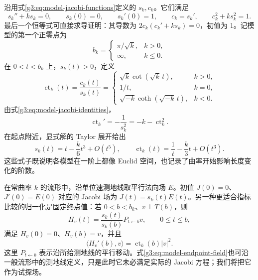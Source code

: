 沿用式\eqref{g3:eq:model-jacobi-functions}定义的 \(s_k,c_k\)。它们满足
\begin{equation}\label{g3:eq:model-jacobi-identities}
	s_k''+ks_k=0,\qquad s_k(0)=0,\qquad s_k'(0)=1,
	\qquad c_k=s_k',\qquad c_k^2+ks_k^2=1.
\end{equation}
最后一个恒等式可直接求导证明：其导数为 \(2c_k(c_k'+ks_k)=0\)，初值为 \(1\)。记模型的第一个正零点为
\begin{equation}\label{g3:eq:model-first-zero}
	b_k=
	\begin{cases}
		\pi/\sqrt{k},&k>0,\\
		\infty,&k\le0.
	\end{cases}
\end{equation}
在 \(0<t<b_k\) 上，\(s_k(t)>0\)，定义
\begin{equation}\label{g3:eq:model-cotangent}
	\operatorname{ct}_k(t)=\frac{c_k(t)}{s_k(t)}
	=
	\begin{cases}
		\sqrt{k}\cot(\sqrt{k}\,t),&k>0,\\
		1/t,&k=0,\\
		\sqrt{-k}\coth(\sqrt{-k}\,t),&k<0.
	\end{cases}
\end{equation}
由式\eqref{g3:eq:model-jacobi-identities}，
\begin{equation}\label{g3:eq:model-cotangent-derivative}
	\operatorname{ct}_k'=-\frac1{s_k^2}
	=-k-\operatorname{ct}_k^2.
\end{equation}
在起点附近，显式解的 Taylor 展开给出
\begin{equation}\label{g3:eq:model-small-radius-expansion}
	s_k(t)=t-\frac{k}{6}t^3+O(t^5),
	\qquad \operatorname{ct}_k(t)=\frac1t-\frac{k}{3}t+O(t^3).
\end{equation}
这些式子既说明各模型在一阶上都像 Euclid 空间，也记录了曲率开始影响长度变化的阶数。

\ProseParagraphBreak

在常曲率 \(k\) 的流形中，沿单位速测地线取平行法向场 \(E\)。初值 \(J(0)=0\)、\(J'(0)=E(0)\) 对应的 Jacobi 场为 \(J(t)=s_k(t)E(t)\)。另一种更适合指标比较的归一化是固定终点值：若 \(0<b<b_k\)、\(v\perp T(b)\)，则
\begin{equation}\label{g3:eq:model-endpoint-field}
	H_v(t)=\frac{s_k(t)}{s_k(b)}P_{t\leftarrow b}v,
	\qquad 0\le t\le b,
\end{equation}
满足 \(H_v(0)=0\)、\(H_v(b)=v\)，并且
\[
	\langle H_v'(b),v\rangle=\operatorname{ct}_k(b)|v|^2.
\]
这里 \(P_{t\leftarrow b}\) 表示沿所给测地线的平行移动。式\eqref{g3:eq:model-endpoint-field}也可沿一般流形中的测地线定义，只是此时它未必满足实际的 Jacobi 方程；我们将把它作为试探场。

